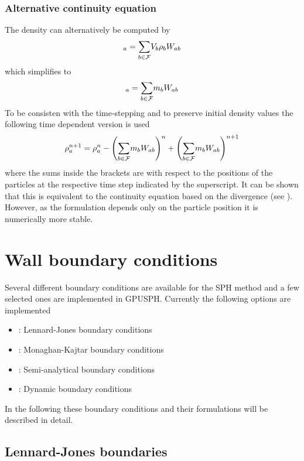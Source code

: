 \documentclass{../GPUSPHtemplate}
\begin{document}
\subsubsection{Alternative continuity equation}
The density can alternatively be computed by
\begin{equation}
[\rho]_a = \sumF V_b \rho_b W_{ab}
\end{equation}
which simplifies to
\begin{equation}
[\rho]_a = \sumF m_b W_{ab}
\label{e:sph:sumrho}
\end{equation}
To be consisten with the time-stepping and to preserve initial density
values the following time dependent version is used
\begin{equation}
\rho_a^{n+1} = \rho_a^n - \left(\underset{b \in \mathcal{F}}{\sum} m_b W_{ab}\right)^n + \left(\underset{b \in \mathcal{F}}{\sum}
m_b W_{ab}\right)^{n+1}
\label{e:sph:sumrho-time}
\end{equation}
where the sums inside the brackets are with respect to the positions of
the particles at the respective time step indicated by the superscript.
It can be shown that this is equivalent to the
continuity equation based on the divergence (see \cite{Vila1999}).
However, as the formulation depends only on the particle
position it is numerically more stable.

\section{Wall boundary conditions}\label{sec:boundary_conditions}

Several different boundary conditions are available for the SPH method
and a few selected ones are implemented in GPUSPH. Currently the
following options are implemented
\begin{itemize}
  \item {}: Lennard-Jones boundary conditions
  \item {}: Monaghan-Kajtar boundary conditions
  \item {}: Semi-analytical boundary conditions
  \item {}: Dynamic boundary conditions
\end{itemize}
In the following these boundary conditions and their formulations will
be described in detail.

\subsection{Lennard-Jones boundaries}
\end{document}
